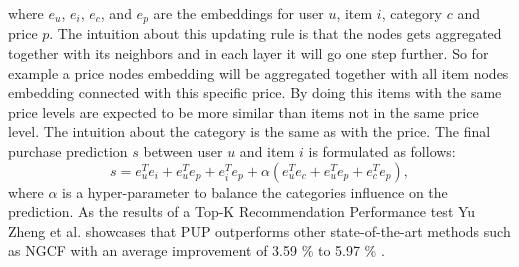 where $e_u$, $e_i$, $e_c$, and $e_p$ are the embeddings for user $u$, item $i$, category $c$ and price $p$.
The intuition about this updating rule is that the nodes gets aggregated together with its neighbors and in each layer it will go one step further.
So for example a price nodes embedding will be aggregated together with all item nodes embedding connected with this specific price.
By doing this items with the same price levels are expected to be more similar than items not in the same price level.
The intuition about the category is the same as with the price.
The final purchase prediction $s$ between user $u$ and item $i$ is formulated as follows:
\begin{equation}
    s = e^T_u e_i + e^T_u e_p + e^T_i e_p + \alpha (e^T_u e_c + e^T_u e_p + e^T_c e_p),
\end{equation}
where $\alpha$ is a hyper-parameter to balance the categories influence on the prediction.
As the results of a Top-K Recommendation Performance test Yu Zheng et al. showcases that PUP outperforms other state-of-the-art methods such as NGCF with an average improvement of 3.59 \% to 5.97 \% \cite{Priceaware}.